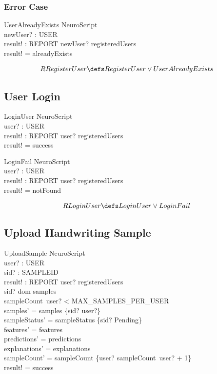 \documentclass[12pt,a4paper]{article}
\begin{document}
\subsubsection*{Error Case}

\begin{schema}{UserAlreadyExists}
\Xi NeuroScript \\
newUser? : USER \\
result! : REPORT
\where
newUser? \in registeredUsers \\
result! = alreadyExists
\end{schema}

\[
RRegisterUser \defs RegisterUser \lor UserAlreadyExists
\]

\subsection{User Login}

\begin{schema}{LoginUser}
\Xi NeuroScript \\
user? : USER \\
result! : REPORT
\where
user? \in registeredUsers \\
result! = success
\end{schema}

\begin{schema}{LoginFail}
\Xi NeuroScript \\
user? : USER \\
result! : REPORT
\where
user? \notin registeredUsers \\
result! = notFound
\end{schema}

\[
RLoginUser \defs LoginUser \lor LoginFail
\]

\subsection{Upload Handwriting Sample}

\begin{schema}{UploadSample}
\Delta NeuroScript \\
user? : USER \\
sid? : SAMPLEID \\
result! : REPORT
\where
user? \in registeredUsers \\
sid? \notin dom samples \\
sampleCount~user? < MAX\_SAMPLES\_PER\_USER \\
samples' = samples \cup \{sid? \mapsto user?\} \\
sampleStatus' = sampleStatus \cup \{sid? \mapsto Pending\} \\
features' = features \\
predictions' = predictions \\
explanations' = explanations \\
sampleCount' = sampleCount \oplus \{user? \mapsto sampleCount~user? + 1\} \\
result! = success
\end{schema}
\end{document}
